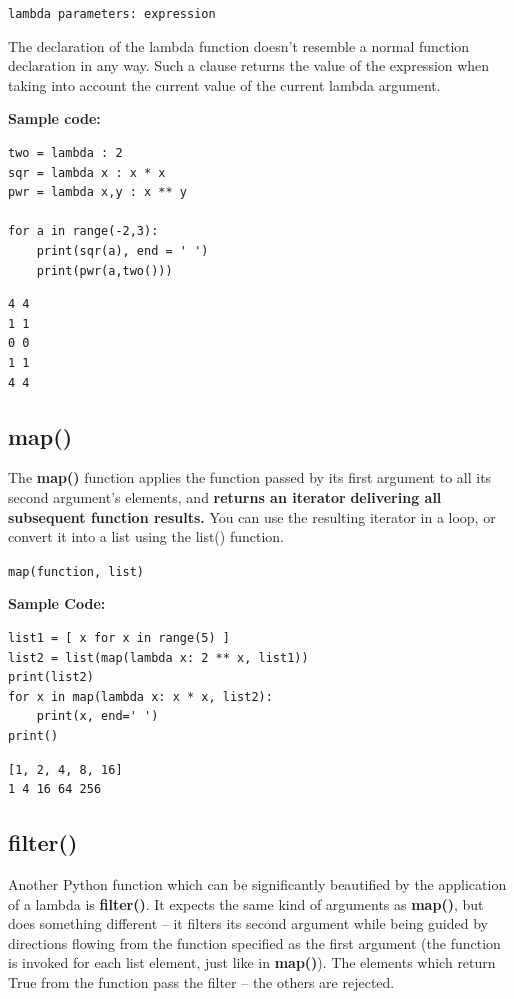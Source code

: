 \documentclass[11pt]{article}
\begin{document}
\texttt{lambda parameters: expression}

The declaration of the lambda function doesn’t resemble a normal
function declaration in any way.  Such a clause returns the value of
the expression when taking into account the current value of the
current lambda argument.

\vspace{10 mm}

\textbf{Sample code:}

\begin{verbatim}
two = lambda : 2
sqr = lambda x : x * x
pwr = lambda x,y : x ** y

for a in range(-2,3):
	print(sqr(a), end = ' ')
	print(pwr(a,two()))
\end{verbatim}

\begin{verbatim}
4 4
1 1
0 0
1 1
4 4
\end{verbatim}
\subsection{map()}
\label{sec:org19401f1}
The \textbf{map()} function applies the function passed by its first argument
to all its second argument’s elements, and \textbf{returns an iterator}
\textbf{delivering all subsequent function results.} You can use the resulting
iterator in a loop, or convert it into a list using the list()
function.

\texttt{map(function, list)}

\textbf{Sample Code:}

\begin{verbatim}
list1 = [ x for x in range(5) ]
list2 = list(map(lambda x: 2 ** x, list1))
print(list2)
for x in map(lambda x: x * x, list2):
	print(x, end=' ')
print()
\end{verbatim}

\begin{verbatim}
[1, 2, 4, 8, 16]
1 4 16 64 256 
\end{verbatim}
\subsection{filter()}
\label{sec:orgaacae6b}
Another Python function which can be significantly beautified by the
application of a lambda is \textbf{filter()}. It expects the same kind of
arguments as \textbf{map()}, but does something different – it filters its
second argument while being guided by directions flowing from the
function specified as the first argument (the function is invoked for
each list element, just like in \textbf{map()}).  The elements which return
True from the function pass the filter – the others are rejected.
\end{document}
